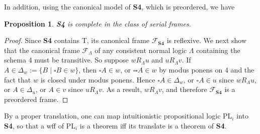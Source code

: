 \documentclass[12pt]{article}
\newtheorem{prop}{Proposition}
\begin{document}
In addition, using the canonical model of \textbf{S4}, which is preordered, we have
\begin{prop} \textbf{S4} is complete in the class of serial frames. \end{prop}
\begin{proof}  Since \textbf{S4} contains T, its canonical frame $\mathcal{F}_{\textbf{S4}}$ is reflexive.  We next show that the canonical frame $\mathcal{F}_{\Lambda}$ of any consistent normal logic $\Lambda$ containing the schema 4 must be transitive.  So suppose $w R_{\Lambda} u$ and $u R_{\Lambda} v$.  If $A \in \Delta_w:=\lbrace B\mid \square B\in w\rbrace$, then $\square A\in w$, or $\square \square A \in w$ by modus ponens on 4 and the fact that $w$ is closed under modus ponens.  Hence $\square A \in \Delta_w$, or $\square A \in u$ since $w R_{\Lambda} u$, or $A \in \Delta_u$, or $A\in v$ since $u R_{\Lambda} v$.  As a result, $w R_{\Lambda} v$, and therefore $\mathcal{F}_{\textbf{S4}}$ is a preordered frame.
\end{proof}

By a proper translation, one can map intuitionistic propositional logic PL$_i$ into \textbf{S4}, so that a wff of PL$_i$ is a theorem iff its translate is a theorem of \textbf{S4}.

\end{document}
